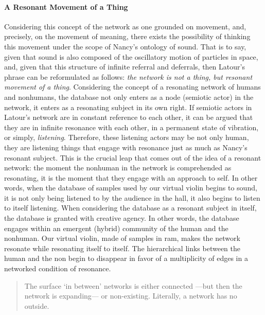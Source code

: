 \paragraph{A Resonant Movement of a Thing}
Considering this concept of the network as one grounded on movement, and, precisely, on the movement of meaning, there exists the possibility of thinking this movement under the scope of Nancy's ontology of sound. That is to say, given that sound is also composed of the oscillatory motion of particles in space, and, given that this structure of infinite referral and deferrals, then Latour's phrase can be reformulated as follows: \textit{the network is not a thing, but resonant movement of a thing}. Considering the concept of a resonating network of humans and nonhumans, the database not only enters as a node (semiotic actor) in the network, it enters as a resonating subject in its own right. If semiotic actors in Latour's network are in constant reference to each other, it can be argued that they are in infinite resonance with each other, in a permanent state of vibration, or simply, \textit{listening}. Therefore, these listening actors may be not only human, they are listening things that engage with resonance just as much as Nancy's resonant subject. This is the crucial leap that comes out of the idea of a resonant network: the moment the nonhuman in the network is comprehended as resonating, it is the moment that they engage with an approach to self. In other words, when the database of samples used by our virtual violin begins to sound, it is not only being listened to by the audience in the hall, it also begins to listen to itself listening. When considering the database as a resonant subject in itself, the database is granted with creative agency. In other words, the database engages within an emergent (hybrid) community of the human and the nonhuman. Our virtual violin, made of samples in \gls{ram}, makes the network resonate while resonating itself to itself. The hierarchical links between the human and the non begin to disappear in favor of a multiplicity of edges in a networked condition of resonance.

\begin{quote}
	The surface `in between' networks is either connected ---but then the network is expanding--- or non-existing. Literally, a network has no outside. \parencite[6]{Lat90:On}
\end{quote} %

